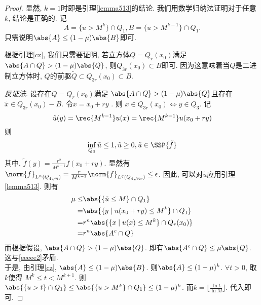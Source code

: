 \begin{proof}
    显然, $k=1$时即是引理\eqref{lemma513}的结论.  我们用数学归纳法证明对于任意$k$, 结论是正确的.  记
    \begin{equation}
        A=\{u > M^k\} \cap Q_1, B=\{u > M^{k-1}\} \cap Q_1.  
    \end{equation}
    只需说明$\abs{A} \le (1-\mu)\abs{B}$即可.  
    \par 根据引理\eqref{cz}, 我们只需要证明, 若立方体$Q=Q_r(x_0)$满足$\abs{A \cap Q} > (1-\mu)\abs{Q}$, 则$Q_{3r}(x_0) \subset B$即可.  因为这意味着当$Q$是二进制立方体时, $Q$的前驱$\tilde{Q} \subset Q_{3r}(x_0) \subset B$.  
    \par \textit{反证法}.  设存在$Q=Q_r(x_0)$满足 $\abs{A \cap Q} > (1-\mu)\abs{Q}$且存在$\tilde{x} \in Q_{3r}(x_0)-B$.  令$x=x_0+ry$ .  则 $x \in Q_{3r}(x_0) \iff y \in Q_3$.  
    记 
    \begin{equation}
        \tilde{u}(y)=\rec{M^{k-1}}u(x)=\rec{M^{k-1}}u(x_0+ry)
    \end{equation}
    则
    \begin{equation}
        \inf_{Q_3} \tilde{{u}} \le 1, \tilde{u} \ge 0 , \tilde{u} \in \SSP{\tilde{f}}
    \end{equation}
    其中, $\tilde{f}(y)=\frac{r^2}{M^{k-1}}f(x_0+ry)$.  显然有 $\norm{\tilde{f}}_{L^n(Q_{4\sqrt{n}})} = \frac{r}{M^{k-1}}\norm{f}_{L^q(Q_{4\sqrt{n}r})} \le  \epsilon$.  因此, 可以对$\tilde{u}$应用引理\eqref{lemma513}.  则有
    \begin{equation} \label{eeeee2}
        \begin{split}
            \mu \le & \abs{\{\tilde{u} \le M\} \cap Q_1} \\
            =& \abs{\{y \mid u(x_0+ry) \le M^k\} \cap Q_1} \\
            =& r^n \abs{\{x \mid u(x) \le M^k\} \cap Q_r(x_0)} \\
            =& r^n \abs{A^c \cap Q}
        \end{split}
    \end{equation}
    而根据假设, $\abs{A\cap Q} > (1-\mu)\abs{Q}$.  即有$\abs{A^c \cap Q} \le \mu\abs{Q}$.  这与\eqref{eeeee2}矛盾.  \\
    于是, 由引理\eqref{cz}, $\abs{A} \le (1-\mu)\abs{B}$.  则$\abs{A} \le (1-\mu)^k$.  $\forall t >0$, 取$k$使得 $M^k \le t < M^{k+1}$.  则 $\abs{\{u>t\} \cap Q_1} \le \abs{\{u>M^k\} \cap Q_1} \le (1-\mu)^k$.  而$k=\lfloor \frac{\ln t}{\ln M} \rfloor$.  代入即可.  
\end{proof}
